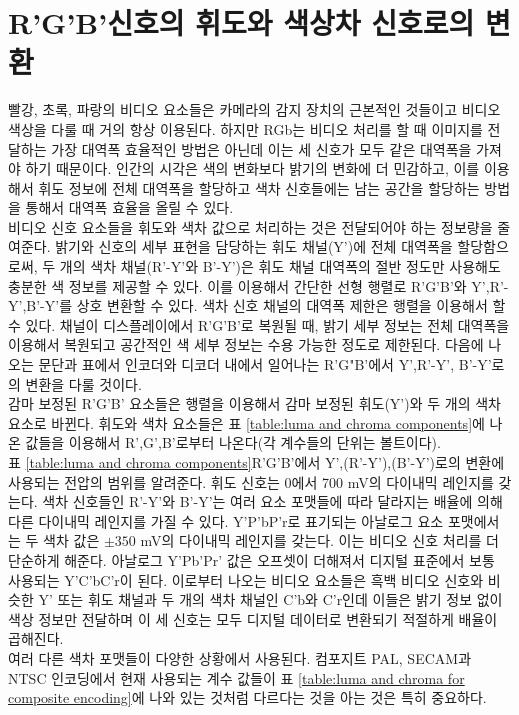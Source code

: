 \section{R'G'B'신호의 휘도와 색상차 신호로의 변환}
빨강, 초록, 파랑의 비디오 요소들은 카메라의 감지 장치의 근본적인 것들이고 비디오 색상을 다룰 때 거의 항상 이용된다.
하지만 RGb는 비디오 처리를 할 때 이미지를 전달하는 가장 대역폭 효율적인 방법은 아닌데 이는 세 신호가 모두 같은 대역폭을 가져야 하기 때문이다.
인간의 시각은 색의 변화보다 밝기의 변화에 더 민감하고, 이를 이용해서 휘도 정보에 전체 대역폭을 할당하고 색차 신호들에는 남는 공간을 할당하는 방법을 통해서 대역폭 효율을 올릴 수 있다.
\\
비디오 신호 요소들을 휘도와 색차 값으로 처리하는 것은 전달되어야 하는 정보량을 줄여준다. 밝기와 신호의 세부 표현을 담당하는 휘도 채널(Y')에 전체 대역폭을 할당함으로써, 두 개의 색차 채널(R'-Y'와 B'-Y')은 휘도 채널 대역폭의 절반 정도만 사용해도 충분한 색 정보를 제공할 수 있다.
이를 이용해서 간단한 선형 행렬로 R'G'B'와 Y',R'-Y',B'-Y'를 상호 변환할 수 있다. 색차 신호 채널의 대역폭 제한은 행렬을 이용해서 할 수 있다.
채널이 디스플레이에서 R'G'B'로 복원될 때, 밝기 세부 정보는 전체 대역폭을 이용해서 복원되고 공간적인 색 세부 정보는 수용 가능한 정도로 제한된다.
다음에 나오는 문단과 표에서 인코더와 디코더 내에서 일어나는 R'G"B'에서 Y',R'-Y', B'-Y'로의 변환을 다룰 것이다.
\\
감마 보정된 R'G'B' 요소들은 행렬을 이용해서 감마 보정된 휘도(Y')와 두 개의 색차 요소로 바뀐다. 휘도와 색차 요소들은 표 \ref{table:luma and chroma components}에 나온 값들을 이용해서 R',G',B'로부터 나온다(각 계수들의 단위는 볼트이다).
\\
표 \ref{table:luma and chroma components}\은 R'G'B'에서 Y',(R'-Y'),(B'-Y')로의 변환에 사용되는 전압의 범위를 알려준다. 휘도 신호는 0에서 700 mV의 다이내믹 레인지를 갖는다.
색차 신호들인 R'-Y'와 B'-Y'는 여러 요소 포맷들에 따라 달라지는 배율에 의해 다른 다이내믹 레인지를 가질 수 있다. Y'P'bP'r로 표기되는 아날로그 요소 포맷에서는 두 색차 값은 $\pm 350$ mV의 다이내믹 레인지를 갖는다. 이는 비디오 신호 처리를 더 단순하게 해준다.
아날로그 Y'Pb'Pr' 값은 오프셋이 더해져서 디지털 표준에서 보통 사용되는 Y'C'bC'r이 된다. 이로부터 나오는 비디오 요소들은 흑백 비디오 신호와 비슷한 Y' 또는 휘도 채널과 두 개의 색차 채널인 C'b와 C'r인데 이들은 밝기 정보 없이 색상 정보만 전달하며 이 세 신호는 모두 디지털 데이터로 변환되기 적절하게 배율이 곱해진다.
\\
여러 다른 색차 포맷들이 다양한 상황에서 사용된다. 컴포지트 PAL, SECAM과 NTSC 인코딩에서 현재 사용되는 계수 값들이 표 \ref{table:luma and chroma for composite encoding}에 나와 있는 것처럼 다르다는 것을 아는 것은 특히 중요하다.
